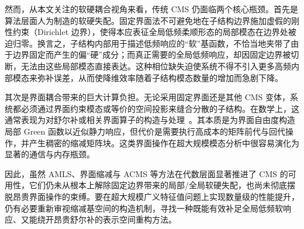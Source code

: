 然而，从本文关注的软硬耦合视角来看，传统 CMS 仍面临两个核心瓶颈。首先是算法层面人为制造的软硬失配。固定界面法不可避免地在子结构边界施加虚假的刚性约束（Dirichlet 边界），使得本应表征全局低频柔顺形态的局部模态在边界处被迫归零。换言之，子结构内部用于描述低频响应的“软”基函数，不恰当地夹带了由于边界固定而产生的偏“硬”成分；而真正需要的全局低频响应，却因固定边界被切断，无法由这些局部模态直接表达。这种相位缺失迫使系统不得不引入更多高频内部模态来弥补误差，从而使降维效率随着子结构模态数量的增加而急剧下降。

其次是界面耦合带来的巨大计算负担。无论采用固定界面还是其他 CMS 变体，系统都必须通过界面约束模态或等价的空间投影来缝合分散的子结构。在数学上，这通常表现为对舒尔补或相关界面算子的构造与处理~\cite{aristidou2013dynamic,KRATTIGER2019Riview}。其本质是为界面自由度构造局部 Green 函数以近似静力响应，但代价是需要执行高成本的矩阵前代与回代操作，并产生稠密的缩减矩阵块。这类界面操作在超大规模模态分析中很容易演化为显著的通信与内存瓶颈。

因此，虽然 AMLS、界面缩减与 ACMS 等方法在代数层面显著推进了 CMS 的可用性，它们仍未从根本上解除固定边界带来的局部/全局软硬失配，也尚未彻底摆脱昂贵界面操作的束缚。要在超大规模广义特征值问题上实现数量级的性能提升，仍有必要重新审视缩减基空间的构造机制，寻找一种既能有效补足全局低频软响应、又能绕开昂贵舒尔补的表示空间重构方法。
